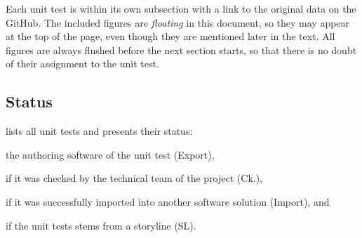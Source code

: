 \documentclass{scrartcl}
\begin{document}
Each unit test is within its own subsection with a link to the original data on the GitHub.
The included figures are \emph{floating} in this document, so they may appear at the top of the page,
 even though they are mentioned later in the text.
All figures are always flushed before the next section starts, so that there is no doubt of their assignment to the unit test.

\subsection{Status}
\label{sec:status}

 lists all unit tests and presents their status:
\begin{compactitem}
  \item the authoring software of the unit test (Export),
  \item if it was checked by the technical team of the project (Ck.),
  \item if it was successfully imported into another software solution (Import), and
  \item if the unit tests stems from a storyline (SL).
\end{compactitem}
\end{document}
